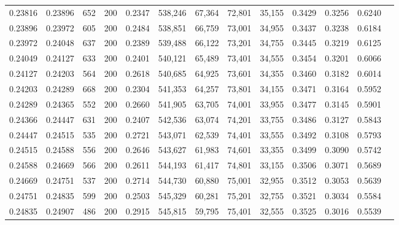 \begin{tabular}{rrrrrrrrrrrrr}
0.23816 & 0.23896 &   652 & 200 &                                     0.2347 & 538,246 &  67,364 &  72,801 &  35,155 & 0.3429 & 0.3256 & 0.6240 \\
0.23896 & 0.23972 &   605 & 200 &                                     0.2484 & 538,851 &  66,759 &  73,001 &  34,955 & 0.3437 & 0.3238 & 0.6184 \\
0.23972 & 0.24048 &   637 & 200 &                                     0.2389 & 539,488 &  66,122 &  73,201 &  34,755 & 0.3445 & 0.3219 & 0.6125 \\
0.24049 & 0.24127 &   633 & 200 &                                     0.2401 & 540,121 &  65,489 &  73,401 &  34,555 & 0.3454 & 0.3201 & 0.6066 \\
0.24127 & 0.24203 &   564 & 200 &                                     0.2618 & 540,685 &  64,925 &  73,601 &  34,355 & 0.3460 & 0.3182 & 0.6014 \\
0.24203 & 0.24289 &   668 & 200 &                                     0.2304 & 541,353 &  64,257 &  73,801 &  34,155 & 0.3471 & 0.3164 & 0.5952 \\
0.24289 & 0.24365 &   552 & 200 &                                     0.2660 & 541,905 &  63,705 &  74,001 &  33,955 & 0.3477 & 0.3145 & 0.5901 \\
0.24366 & 0.24447 &   631 & 200 &                                     0.2407 & 542,536 &  63,074 &  74,201 &  33,755 & 0.3486 & 0.3127 & 0.5843 \\
0.24447 & 0.24515 &   535 & 200 &                                     0.2721 & 543,071 &  62,539 &  74,401 &  33,555 & 0.3492 & 0.3108 & 0.5793 \\
0.24515 & 0.24588 &   556 & 200 &                                     0.2646 & 543,627 &  61,983 &  74,601 &  33,355 & 0.3499 & 0.3090 & 0.5742 \\
0.24588 & 0.24669 &   566 & 200 &                                     0.2611 & 544,193 &  61,417 &  74,801 &  33,155 & 0.3506 & 0.3071 & 0.5689 \\
0.24669 & 0.24751 &   537 & 200 &                                     0.2714 & 544,730 &  60,880 &  75,001 &  32,955 & 0.3512 & 0.3053 & 0.5639 \\
0.24751 & 0.24835 &   599 & 200 &                                     0.2503 & 545,329 &  60,281 &  75,201 &  32,755 & 0.3521 & 0.3034 & 0.5584 \\
0.24835 & 0.24907 &   486 & 200 &                                     0.2915 & 545,815 &  59,795 &  75,401 &  32,555 & 0.3525 & 0.3016 & 0.5539 \\

\end{tabular}
